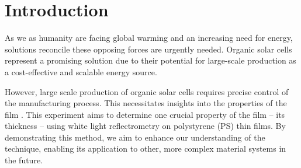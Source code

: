 

\chapter{Introduction}
\label{chap:einleitung}

As we as humanity are facing global warming and an increasing need for energy, solutions reconcile these opposing forces are urgently needed. Organic solar cells represent a promising solution due to their potential for large-scale production as a cost-effective and scalable energy source.


However, large scale production of organic solar cells requires precise control of the manufacturing process. This necessitates insights into the properties of the film . This experiment aims to determine one crucial property of the film -- its thickness -- using white light reflectrometry on polystyrene (PS) thin films.  By demonstrating this method, we aim to enhance our understanding of the technique, enabling its application to other, more complex material systems in the future.


